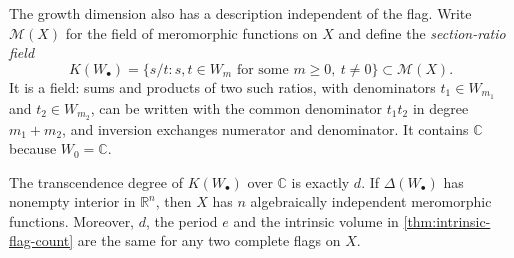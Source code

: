 The growth dimension also has a description independent of the flag. Write $\mathcal M(X)$ for the field of meromorphic functions on $X$ and define the \emph{section-ratio field}
\[
 K(W_\bullet)=\{s/t:s,t\in W_m\text{ for some }m\geq0,
                                  \ t\neq0\}\subset\mathcal M(X).
\]
It is a field: sums and products of two such ratios, with denominators $t_1\in W_{m_1}$ and $t_2\in W_{m_2}$, can be written with the common denominator $t_1t_2$ in degree $m_1+m_2$, and inversion exchanges numerator and denominator. It contains $\mathbb C$ because $W_0=\mathbb C$.

\begin{proposition}\label{prop:flag-dimension-section-field}\label{prop:full-flag-body-meromorphic}
The transcendence degree of $K(W_\bullet)$ over $\mathbb C$ is exactly $d$. If $\Delta(W_\bullet)$ has nonempty interior in $\mathbb R^n$, then $X$ has $n$ algebraically independent meromorphic functions. Moreover, $d$, the period $e$ and the intrinsic volume in \cref{thm:intrinsic-flag-count} are the same for any two complete flags on $X$.
\end{proposition}
